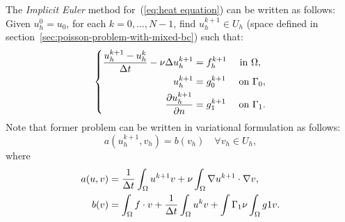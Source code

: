 \documentclass[12pt]{article}
\begin{document}
The \textit{Implicit Euler} method for~(\ref{eq:heat equation}) can be
written as follows:
Given $u^0_h=u_0$, for each $k=0,...,N-1$, find $u^{k+1}_h\in U_h$ (space
defined in section~\ref{sec:poisson-problem-with-mixed-bc}) such that:
\begin{equation}
  \label{eq:euler-implicit-heat-equation}
  \left\{
    \begin{aligned}
      \frac{u^{k+1}_h-u^k_h}{\Delta t} -\nu\Delta u^{k+1}_h &= f^{k+1}_h \quad \text{ in } \Omega, \\
      u^{k+1}_h &= g_0^{k+1} \quad \text{ on } \Gamma_0, \\
      \frac{\partial u^{k+1}_h}{\partial n} &= g_1^{k+1} \quad \text{ on } \Gamma_1.
    \end{aligned}
    \right.
\end{equation}
Note that former problem can be written in variational formulation as follows:
\begin{equation*}
  a(u^{k+1}_h,v_h) = b(v_h) \quad \forall v_h\in U_h,
\end{equation*}
where
\begin{equation*}
    \begin{aligned}
      a(u,v)&=\frac{1}{\Delta t} \int_\Omega u^{k+1} v + \nu\int_\Omega \nabla
      u^{k+1} \cdot \nabla v,
      \\
      b(v)  &= \int_\Omega f \cdot v
      +\frac{1}{\Delta t} \int_\Omega  u^{k} v
      +\int{\Gamma_1} \nu\int_\Omega g1 v.
    \end{aligned}
\end{equation*}
\end{document}
